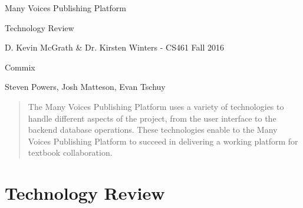 \documentclass[letterpaper, 10pt, draftclsnofoot, compsoc, onecolumn]{IEEEtran}
\begin{document}
\begin{titlepage}
\centering
{\huge Many Voices Publishing Platform\par}
{\LARGE Technology Review\par}
{\vspace{5mm}}
{\large D. Kevin McGrath \& Dr. Kirsten Winters -  CS461 Fall 2016\par}
{\large Commix\par}
{\large Steven Powers, Josh Matteson, Evan Tschuy\par}
{\vspace{10mm}}

\begin{abstract}
\noindent The Many Voices Publishing Platform uses a variety of technologies to handle different aspects of the project, from the user interface to the backend database operations. These technologies enable to the Many Voices Publishing Platform to succeed in delivering a working platform for textbook collaboration.
\end{abstract}

\end{titlepage}

\tableofcontents

\newpage

\setcounter{page}{1}\pagestyle{fancy}

\vspace{1pc}
\section{Technology Review}
\end{document}
